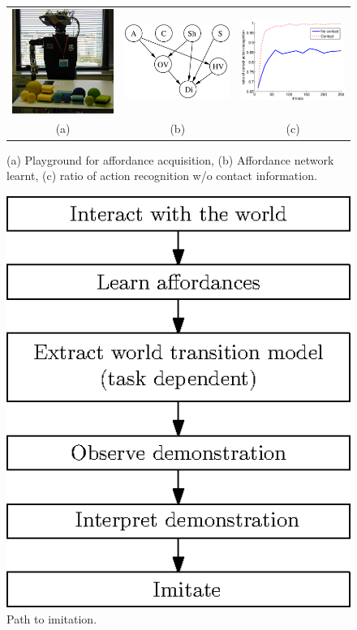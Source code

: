 \begin{figure}
\begin{tabular}{ccc}
\includegraphics[width=0.3\columnwidth]{images/setup.eps} &
\includegraphics[width=0.3\columnwidth]{images/MCMCIROS1_p072.eps} &
\includegraphics[width=0.3\columnwidth]{images/resIROSActionRecog.eps} \\
(a) & (b) & (c) \\
\end{tabular}
\caption{(a) Playground for affordance acquisition, (b) Affordance
  network learnt,  (c) ratio of action recognition w/o contact
  information.}
\label{fig:manipulation:affordances}
\end{figure}


\begin{figure}
\centering
\includegraphics[width=0.3\columnwidth]{images/Diagram.eps}
\caption{Path to imitation.}
\label{fig:manipulation:path}
\end{figure}

